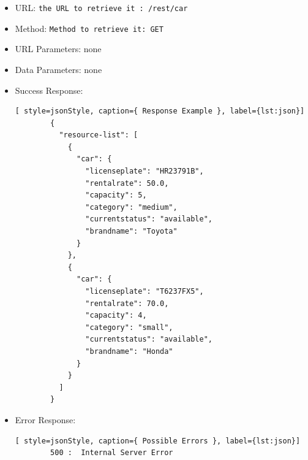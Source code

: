 \begin{itemize}
    \item URL: \texttt{the URL to retrieve it : /rest/car}
    \item Method: \texttt{Method to retrieve it: GET}
    \item URL Parameters: none
    \item Data Parameters: none
    \item Success Response: 
        \begin{lstlisting}[ style=jsonStyle, caption={ Response Example }, label={lst:json}]
        {
          "resource-list": [
            {
              "car": {
                "licenseplate": "HR23791B",
                "rentalrate": 50.0,
                "capacity": 5,
                "category": "medium",
                "currentstatus": "available",
                "brandname": "Toyota"
              }
            },
            {
              "car": {
                "licenseplate": "T6237FX5",
                "rentalrate": 70.0,
                "capacity": 4,
                "category": "small",
                "currentstatus": "available",
                "brandname": "Honda"
              }
            }
          ]
        }
        \end{lstlisting}
        
    \item Error Response: 
        \begin{lstlisting}[ style=jsonStyle, caption={ Possible Errors }, label={lst:json}]
        500 :  Internal Server Error
    \end{lstlisting}

    
\end{itemize}

